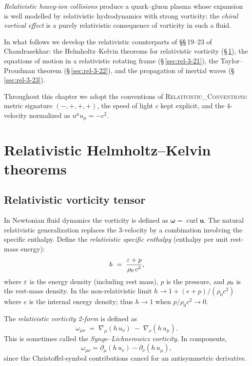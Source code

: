 \emph{Relativistic heavy-ion collisions} produce a quark--gluon plasma
whose expansion is well modelled by relativistic hydrodynamics with strong
vorticity; the \emph{chiral vortical effect} is a purely relativistic
consequence of vorticity in such a fluid.

In what follows we develop the relativistic counterparts of
\S\S\,19--23 of Chandrasekhar: the Helmholtz--Kelvin theorems for
relativistic vorticity (\S\,\ref{sec:rel-3-20}), the equations of motion
in a relativistic rotating frame (\S\,\ref{sec:rel-3-21}), the
Taylor--Proudman theorem (\S\,\ref{sec:rel-3-22}), and the propagation
of inertial waves (\S\,\ref{sec:rel-3-23}).

Throughout this chapter we adopt the conventions of
\textsc{Relativistic\_Conventions}: metric signature $(-,+,+,+)$,
the speed of light $c$ kept explicit, and the 4-velocity normalized as
$u^{\mu}u_{\mu} = -c^{2}$.


\section{Relativistic Helmholtz--Kelvin theorems}\label{sec:rel-3-20}

\subsection{Relativistic vorticity tensor}

In Newtonian fluid dynamics the vorticity is defined as
$\boldsymbol{\omega} = \operatorname{curl}\mathbf{u}$.
The natural relativistic generalization replaces the 3-velocity by
a combination involving the specific enthalpy.
Define the \emph{relativistic specific enthalpy} (enthalpy per unit
rest-mass energy):
\begin{equation}\label{eq:rel-3-1}
  h \;=\; \frac{\varepsilon + p}{\rho_0\, c^{2}},
\end{equation}
where $\varepsilon$ is the energy density (including rest mass),
$p$ is the pressure, and $\rho_0$ is the rest-mass density.
In the non-relativistic limit $h \to 1 + (e + p)/(\rho_{0}c^{2})$
where $e$ is the internal energy density; thus $h\to 1$ when
$p/\rho_{0}c^{2} \to 0$.

The \emph{relativistic vorticity 2-form} is defined as
\begin{equation}\label{eq:rel-3-2}
  \boxed{\;
  \omega_{\mu\nu}
  \;=\;
  \nabla_{\mu}(h\,u_{\nu})
  \;-\;
  \nabla_{\nu}(h\,u_{\mu}).
  \;}
\end{equation}
This is sometimes called the \emph{Synge--Lichnerowicz vorticity}.
In components,
\begin{equation}\label{eq:rel-3-3}
  \omega_{\mu\nu}
  = \partial_{\mu}(h\,u_{\nu}) - \partial_{\nu}(h\,u_{\mu}),
\end{equation}
since the Christoffel-symbol contributions cancel for an antisymmetric
derivative.

